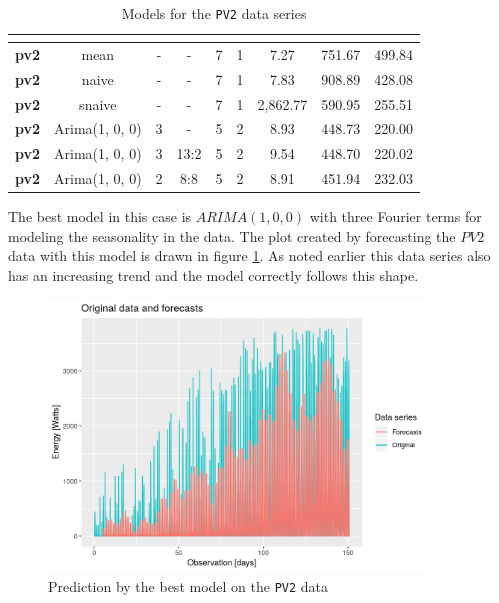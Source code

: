\documentclass[12pt,a4paper,titlepage]{report}
\begin{document}
\begin{table}[htbp]
\begin{tabular}{|c|c|c|c|c|c|c|c|c|}
        \textbf{}         &                         &   &      &   &   &          &        &        \\ \hline
        \textbf{pv2}      & mean                    & - & -    & 7 & 1 & 7.27     & 751.67 & 499.84 \\ \hline
        \textbf{pv2}      & naive                   & - & -    & 7 & 1 & 7.83     & 908.89 & 428.08 \\ \hline
        \textbf{pv2}      & snaive                  & - & -    & 7 & 1 & 2,862.77 & 590.95 & 255.51 \\ \hline
        \textbf{pv2}      & Arima(1, 0, 0)          & 3 & -    & 5 & 2 & 8.93     & 448.73 & 220.00 \\ \hline
        \textbf{pv2}      & Arima(1, 0, 0)          & 3 & 13:2 & 5 & 2 & 9.54     & 448.70 & 220.02 \\ \hline
        \textbf{pv2}      & Arima(1, 0, 0)          & 2 & 8:8  & 5 & 2 & 8.91     & 451.94 & 232.03 \\ \hline
    \end{tabular}
    
    \centering
    \caption{Models for the \texttt{PV2} data series}
    \label{pv2results}
\end{table}

The best model in this case is $ ARIMA(1,0,0) $ with three Fourier terms for modeling the seasonality in the data. The plot created by forecasting the $ PV2 $ data with this model is drawn in figure \ref{dbestpv2}. As noted earlier this data series also has an increasing trend and the model correctly follows this shape.

\begin{figure}[htbp]
    \centering
    \includegraphics[width=0.9\textwidth]{dbestpv2}
    \caption{Prediction by the best model on the \texttt{PV2} data}
    \label{dbestpv2}
\end{figure}
\end{document}
